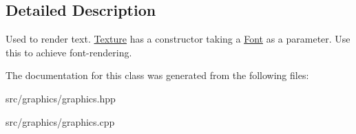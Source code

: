 \subsection{Detailed Description}
Used to render text. \mbox{\hyperlink{class_texture}{Texture}} has a constructor taking a \mbox{\hyperlink{class_font}{Font}} as a parameter. Use this to achieve font-\/rendering. 

The documentation for this class was generated from the following files\+:\begin{DoxyCompactItemize}
\item 
src/graphics/graphics.\+hpp\item 
src/graphics/graphics.\+cpp\end{DoxyCompactItemize}

